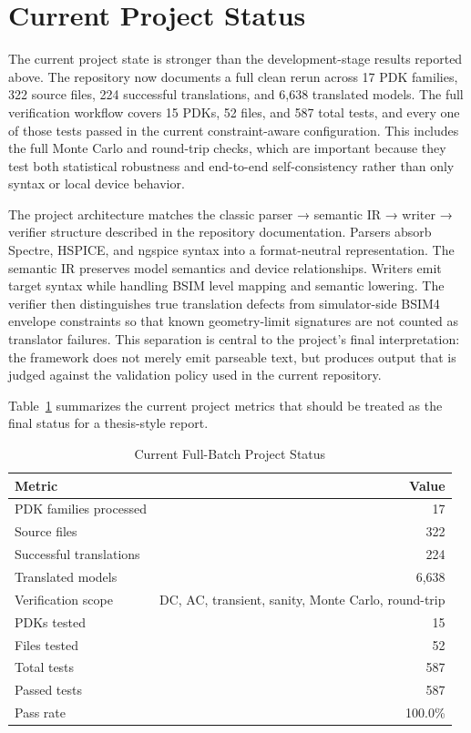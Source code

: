 \documentclass[10pt,twocolumn]{article}
\begin{document}
\section{Current Project Status}
\label{sec:current_status}

The current project state is stronger than the development-stage results reported above. The repository now documents a full clean rerun across 17 PDK families, 322 source files, 224 successful translations, and 6,638 translated models. The full verification workflow covers 15 PDKs, 52 files, and 587 total tests, and every one of those tests passed in the current constraint-aware configuration. This includes the full Monte Carlo and round-trip checks, which are important because they test both statistical robustness and end-to-end self-consistency rather than only syntax or local device behavior.

The project architecture matches the classic parser → semantic IR → writer → verifier structure described in the repository documentation. Parsers absorb Spectre, HSPICE, and ngspice syntax into a format-neutral representation. The semantic IR preserves model semantics and device relationships. Writers emit target syntax while handling BSIM level mapping and semantic lowering. The verifier then distinguishes true translation defects from simulator-side BSIM4 envelope constraints so that known geometry-limit signatures are not counted as translator failures. This separation is central to the project's final interpretation: the framework does not merely emit parseable text, but produces output that is judged against the validation policy used in the current repository.

Table~\ref{tab:current_status} summarizes the current project metrics that should be treated as the final status for a thesis-style report.

\begin{table}[!t]
\caption{Current Full-Batch Project Status}
\label{tab:current_status}
\centering
\renewcommand{\arraystretch}{1.1}
\begin{tabular}{@{}lr@{}}
\toprule
\textbf{Metric} & \textbf{Value} \\
\midrule
PDK families processed & 17 \\
Source files & 322 \\
Successful translations & 224 \\
Translated models & 6,638 \\
Verification scope & DC, AC, transient, sanity, Monte Carlo, round-trip \\
PDKs tested & 15 \\
Files tested & 52 \\
Total tests & 587 \\
Passed tests & 587 \\
Pass rate & 100.0\% \\
\bottomrule
\end{tabular}
\end{table}
\end{document}

